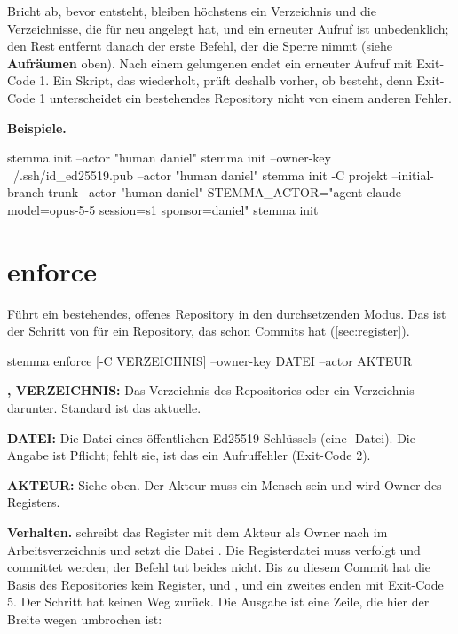 Bricht  ab, bevor  entsteht, bleiben höchstens ein Verzeichnis
 und die Verzeichnisse, die  für  neu angelegt hat,
und ein erneuter Aufruf ist unbedenklich; den Rest entfernt danach
der erste Befehl, der die Sperre nimmt (siehe {\bf Aufräumen} oben).
Nach einem gelungenen  endet ein erneuter Aufruf mit Exit-Code 1.
Ein Skript, das  wiederholt, prüft deshalb vorher, ob  besteht,
denn Exit-Code 1 unterscheidet ein bestehendes Repository nicht von einem anderen Fehler.

{\bf Beispiele.}

\starttyping
stemma init --actor "human daniel"
stemma init --owner-key ~/.ssh/id_ed25519.pub --actor "human daniel"
stemma init -C projekt --initial-branch trunk --actor "human daniel"
STEMMA_ACTOR="agent claude model=opus-5-5 session=s1 sponsor=daniel" stemma init
\stoptyping

\section{enforce}

Führt ein bestehendes, offenes Repository in den durchsetzenden Modus.
Das ist der Schritt von  für ein Repository, das schon Commits hat
([sec:register]).

\starttyping
stemma enforce [-C VERZEICHNIS] --owner-key DATEI --actor AKTEUR
\stoptyping

\startitemize
\item {\bf {},  VERZEICHNIS:} Das Verzeichnis des Repositories
oder ein Verzeichnis darunter.
Standard ist das aktuelle.
\item {\bf {} DATEI:} Die Datei eines öffentlichen Ed25519-Schlüssels
(eine -Datei). Die Angabe ist Pflicht; fehlt sie, ist das ein Aufruffehler
(Exit-Code 2).
\item {\bf {} AKTEUR:} Siehe oben. Der Akteur muss ein Mensch sein und wird
Owner des Registers.
\stopitemize

{\bf Verhalten.}  schreibt das Register mit dem Akteur als Owner nach
 im Arbeitsverzeichnis
und setzt die Datei .
Die Registerdatei muss verfolgt und committet werden; der Befehl tut beides nicht.
Bis zu diesem Commit hat die Basis des Repositories kein Register,
und ,  und ein zweites  enden mit Exit-Code 5.
Der Schritt hat keinen Weg zurück.
Die Ausgabe ist eine Zeile, die hier der Breite wegen umbrochen ist:

